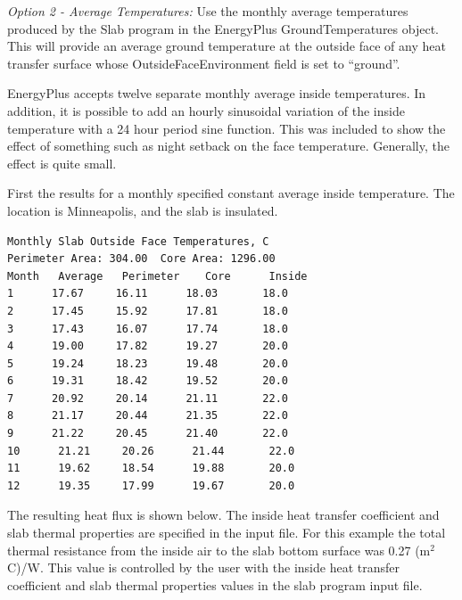 \emph{Option 2 - Average Temperatures:} Use the monthly average temperatures produced by the Slab program in the EnergyPlus GroundTemperatures object. This will provide an average ground temperature at the outside face of any heat transfer surface whose OutsideFaceEnvironment field is set to ``ground''.

EnergyPlus accepts twelve separate monthly average inside temperatures. In addition, it is possible to add an hourly sinusoidal variation of the inside temperature with a 24 hour period sine function. This was included to show the effect of something such as night setback on the face temperature. Generally, the effect is quite small.

First the results for a monthly specified constant average inside temperature. The location is Minneapolis, and the slab is insulated.

\begin{lstlisting}
Monthly Slab Outside Face Temperatures, C
Perimeter Area: 304.00  Core Area: 1296.00
Month   Average   Perimeter    Core      Inside
1      17.67     16.11      18.03       18.0
2      17.45     15.92      17.81       18.0
3      17.43     16.07      17.74       18.0
4      19.00     17.82      19.27       20.0
5      19.24     18.23      19.48       20.0
6      19.31     18.42      19.52       20.0
7      20.92     20.14      21.11       22.0
8      21.17     20.44      21.35       22.0
9      21.22     20.45      21.40       22.0
10      21.21     20.26      21.44       22.0
11      19.62     18.54      19.88       20.0
12      19.35     17.99      19.67       20.0
\end{lstlisting}

The resulting heat flux is shown below. The inside heat transfer coefficient and slab thermal properties are specified in the input file. For this example the total thermal resistance from the inside air to the slab bottom surface was 0.27 (m\(^{2}\) C)/W. This value is controlled by the user with the inside heat transfer coefficient and slab thermal properties values in the slab program input file.

